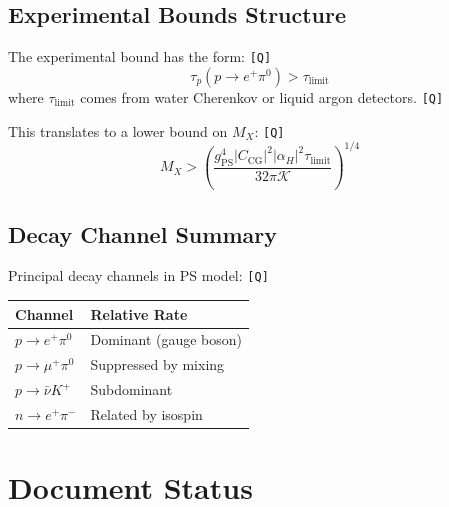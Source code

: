 \documentclass[11pt,a4paper]{article}
\newcommand{\tagQ}{\textcolor{red!70!black}{\texttt{[Q]}}}
\theoremstyle{definition}
\begin{document}
\subsection{Experimental Bounds Structure}
\label{subsec:exp-bounds}

The experimental bound has the form: \tagQ{}
\begin{equation}
\label{eq:exp-bound-structure}
\tau_p(p \to e^+ \pi^0) > \tau_{\text{limit}}
\end{equation}
where $\tau_{\text{limit}}$ comes from water Cherenkov or liquid argon detectors. \tagQ{}

This translates to a lower bound on $M_X$: \tagQ{}
\begin{equation}
\label{eq:mx-bound}
M_X > \left( \frac{g_{\text{PS}}^4 |C_{\text{CG}}|^2 |\alpha_H|^2 \tau_{\text{limit}}}{32\pi \mathcal{K}} \right)^{1/4}
\end{equation}

\subsection{Decay Channel Summary}
\label{subsec:channels}

Principal decay channels in PS model: \tagQ{}
\begin{center}
\begin{tabular}{ll}
\toprule
Channel & Relative Rate \\
\midrule
$p \to e^+ \pi^0$ & Dominant (gauge boson) \\
$p \to \mu^+ \pi^0$ & Suppressed by mixing \\
$p \to \bar{\nu} K^+$ & Subdominant \\
$n \to e^+ \pi^-$ & Related by isospin \\
\bottomrule
\end{tabular}
\end{center}


\section{Document Status}
\label{sec:status}
\end{document}
